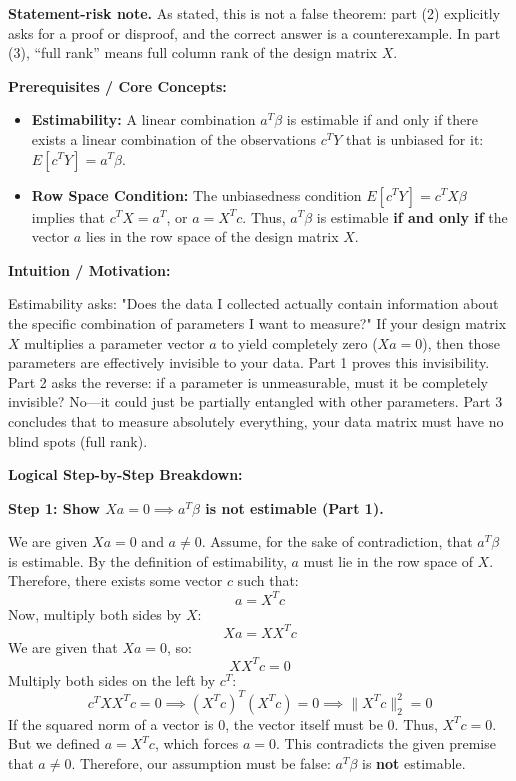 \begin{solution}
\textbf{Statement-risk note.}
As stated, this is not a false theorem: part (2) explicitly asks for a proof or
disproof, and the correct answer is a counterexample. In part (3), ``full rank''
means full column rank of the design matrix $X$.

\textbf{Prerequisites / Core Concepts:}
\begin{itemize}
    \item \textbf{Estimability:} A linear combination $a^T \beta$ is estimable if and only if there exists a linear combination of the observations $c^T Y$ that is unbiased for it: $E[c^T Y] = a^T \beta$.
    \item \textbf{Row Space Condition:} The unbiasedness condition $E[c^T Y] = c^T X \beta$ implies that $c^T X = a^T$, or $a = X^T c$. Thus, $a^T \beta$ is estimable \textbf{if and only if} the vector $a$ lies in the row space of the design matrix $X$.
\end{itemize}

\textbf{Intuition / Motivation:}

Estimability asks: "Does the data I collected actually contain information about the specific combination of parameters I want to measure?" If your design matrix $X$ multiplies a parameter vector $a$ to yield completely zero ($Xa = 0$), then those parameters are effectively invisible to your data. Part 1 proves this invisibility. Part 2 asks the reverse: if a parameter is unmeasurable, must it be completely invisible? No—it could just be partially entangled with other parameters. Part 3 concludes that to measure absolutely everything, your data matrix must have no blind spots (full rank).

\textbf{Logical Step-by-Step Breakdown:}

\textbf{Step 1: Show $Xa = 0 \implies a^T \beta$ is not estimable (Part 1).}

We are given $Xa = 0$ and $a \neq 0$.
Assume, for the sake of contradiction, that $a^T \beta$ is estimable.
By the definition of estimability, $a$ must lie in the row space of $X$. Therefore, there exists some vector $c$ such that:
\[ a = X^T c \]
Now, multiply both sides by $X$:
\[ Xa = X X^T c \]
We are given that $Xa = 0$, so:
\[ X X^T c = 0 \]
Multiply both sides on the left by $c^T$:
\[ c^T X X^T c = 0 \implies (X^T c)^T (X^T c) = 0 \implies \|X^T c\|_2^2 = 0 \]
If the squared norm of a vector is 0, the vector itself must be 0. Thus, $X^T c = 0$.
But we defined $a = X^T c$, which forces $a = 0$.
This contradicts the given premise that $a \neq 0$.
Therefore, our assumption must be false: $a^T \beta$ is \textbf{not} estimable.


\end{solution}
